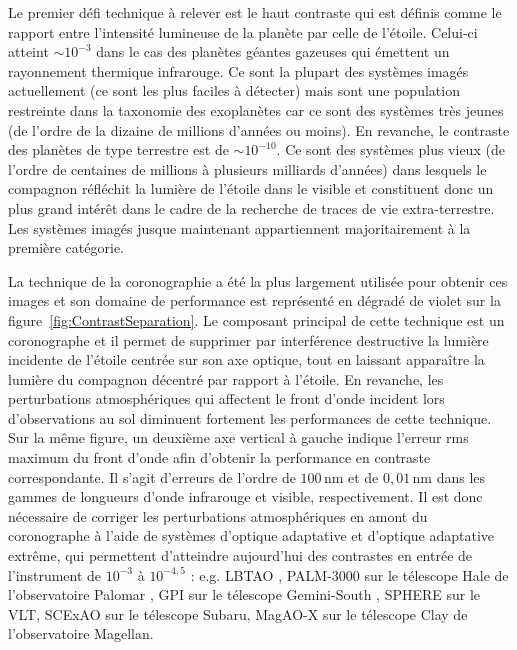 Le premier défi technique à relever est le haut contraste qui est définis comme le rapport entre l'intensité lumineuse de la planète par celle de l'étoile. Celui-ci atteint $\sim 10^{-3}$ dans le cas des planètes géantes gazeuses qui émettent un rayonnement thermique infrarouge. Ce sont la plupart des systèmes imagés actuellement (ce sont les plus faciles à détecter) mais sont une population restreinte dans la taxonomie des exoplanètes car ce sont des systèmes très jeunes (de l'ordre de la dizaine de millions d'années ou moins). En revanche, le contraste des planètes de type terrestre est de $\sim 10^{-10}$. Ce sont des systèmes plus vieux (de l'ordre de centaines de millions à plusieurs milliards d'années) dans lesquels le compagnon réfléchit la lumière de l'étoile dans le visible et constituent donc un plus grand intérêt dans le cadre de la recherche de traces de vie extra-terrestre. Les systèmes imagés jusque maintenant appartiennent majoritairement à la première catégorie.

La technique de la coronographie \citep{lyot1939} a été la plus largement utilisée pour obtenir ces images et son domaine de performance est représenté en dégradé de violet sur la figure~\ref{fig:ContrastSeparation}. Le composant principal de cette technique est un coronographe et il permet de supprimer par interférence destructive la lumière incidente de l'étoile centrée sur son axe optique, tout en laissant apparaître la lumière du compagnon décentré par rapport à l'étoile. En revanche, les perturbations atmosphériques qui affectent le front d'onde incident lors d'observations au sol diminuent fortement les performances de cette technique. Sur la même figure, un deuxième axe vertical à gauche indique l'erreur rms maximum du front d'onde afin d'obtenir la performance en contraste correspondante. Il s'agit d'erreurs de l'ordre de $100 \,$nm et de $0,01 \,$nm dans les gammes de longueurs d'onde infrarouge et visible, respectivement. Il est donc nécessaire de corriger les perturbations atmosphériques en amont du coronographe \citep{sivaramakrishnan2001} à l'aide de systèmes d'optique adaptative \citep{rousset1990} et d'optique adaptative extrême, qui permettent d'atteindre aujourd'hui des contrastes en entrée de l'instrument de $10^{-3}$ à $10^{-4,5}$ : e.g. \ac{LBTAO} \citep{esposito2011}, PALM-3000 sur le télescope Hale de l'observatoire Palomar \citep{dekany2013}, \ac{GPI} sur le télescope Gemini-South \citep{macintosh2014}, \ac{SPHERE} \citep{beuzit2019} sur le \ac{VLT}, \ac{SCExAO} \citep{jovanovic2015} sur le télescope Subaru, \ac{MagAO-X} \citep{males2020} sur le télescope Clay de l'observatoire Magellan.

